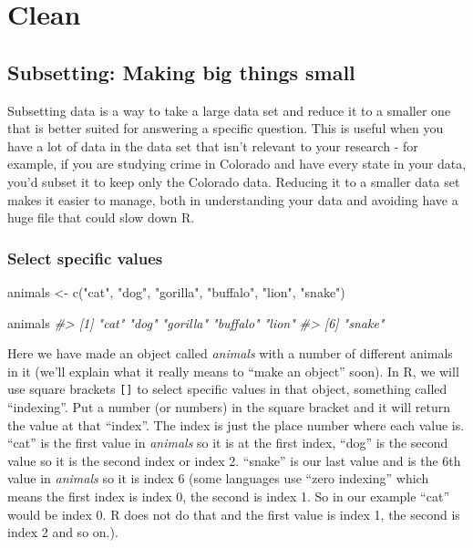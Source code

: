 \documentclass[
]{krantz}
\makeatletter
\newenvironment{Shaded}{\begin{snugshade}}{\end{snugshade}}
\newcommand{\CommentTok}[1]{\textcolor[rgb]{0.37,0.37,0.37}{\textit{#1}}}
\newcommand{\FunctionTok}[1]{\textcolor[rgb]{0,0,0}{#1}}
\newcommand{\NormalTok}[1]{#1}
\newcommand{\OtherTok}[1]{\textcolor[rgb]{0.37,0.37,0.37}{#1}}
\newcommand{\StringTok}[1]{\textcolor[rgb]{0.5,0.5,0.5}{#1}}
\newenvironment{kframe}{%
\medskip{}
\setlength{\fboxsep}{.8em}
 \def\at@end@of@kframe{}%
 \ifinner\ifhmode%
  \def\at@end@of@kframe{\end{minipage}}%
  \begin{minipage}{\columnwidth}%
 \fi\fi%
 \def\FrameCommand##1{\hskip\@totalleftmargin \hskip-\fboxsep
 \colorbox{shadecolor}{##1}\hskip-\fboxsep
     \hskip-\linewidth \hskip-\@totalleftmargin \hskip\columnwidth}%
 \MakeFramed {\advance\hsize-\width
   \@totalleftmargin\z@ \linewidth\hsize
   \@setminipage}}%
 {\par\unskip\endMakeFramed%
 \at@end@of@kframe}
\renewenvironment{Shaded}{\begin{kframe}}{\end{kframe}}
\makeatother
\begin{document}
\hypertarget{part-clean}{%
\part{Clean}\label{part-clean}}

\hypertarget{subsetting-intro}{%
\chapter{Subsetting: Making big things small}\label{subsetting-intro}}

Subsetting data is a way to take a large data set and reduce it to a smaller one that is better suited for answering a specific question. This is useful when you have a lot of data in the data set that isn't relevant to your research - for example, if you are studying crime in Colorado and have every state in your data, you'd subset it to keep only the Colorado data. Reducing it to a smaller data set makes it easier to manage, both in understanding your data and avoiding have a huge file that could slow down R.

\hypertarget{select-specific-values}{%
\section{Select specific values}\label{select-specific-values}}

\begin{Shaded}
\begin{Highlighting}[]
\NormalTok{animals }\OtherTok{\textless{}{-}} \FunctionTok{c}\NormalTok{(}\StringTok{"cat"}\NormalTok{, }\StringTok{"dog"}\NormalTok{, }\StringTok{"gorilla"}\NormalTok{, }\StringTok{"buffalo"}\NormalTok{, }\StringTok{"lion"}\NormalTok{,}
  \StringTok{"snake"}\NormalTok{)}
\end{Highlighting}
\end{Shaded}

\begin{Shaded}
\begin{Highlighting}[]
\NormalTok{animals}
\CommentTok{\#\textgreater{} [1] "cat"     "dog"     "gorilla" "buffalo" "lion"   }
\CommentTok{\#\textgreater{} [6] "snake"}
\end{Highlighting}
\end{Shaded}

Here we have made an object called \emph{animals} with a number of different animals in it (we'll explain what it really means to ``make an object'' soon). In R, we will use square brackets \texttt{{[}{]}} to select specific values in that object, something called ``indexing''. Put a number (or numbers) in the square bracket and it will return the value at that ``index''. The index is just the place number where each value is. ``cat'' is the first value in \emph{animals} so it is at the first index, ``dog'' is the second value so it is the second index or index 2. ``snake'' is our last value and is the 6th value in \emph{animals} so it is index 6 (some languages use ``zero indexing'' which means the first index is index 0, the second is index 1. So in our example ``cat'' would be index 0. R does not do that and the first value is index 1, the second is index 2 and so on.).
\end{document}
